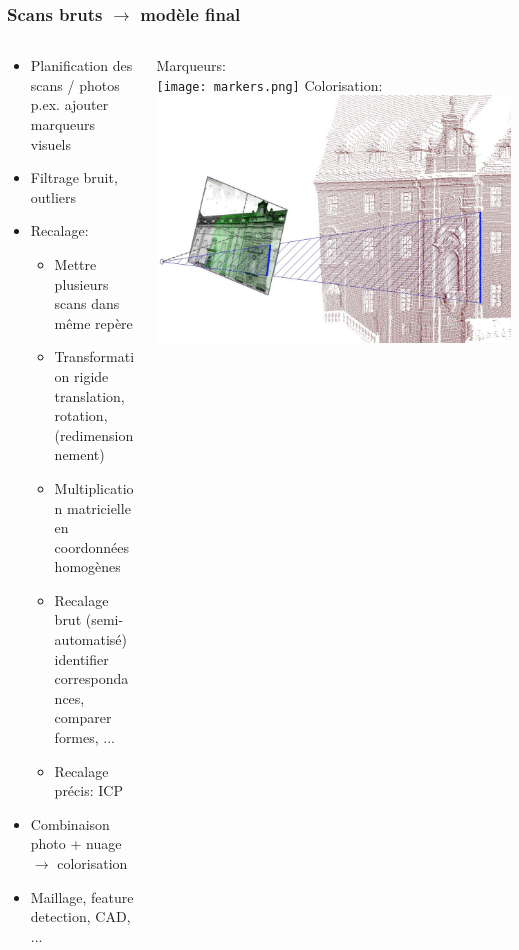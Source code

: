 \documentclass{beamer}
\begin{document}
\begin{frame}
\frametitle{Scans bruts $\rightarrow$ modèle final}
	\begin{columns}
	\begin{column}[T]{.7\textwidth}
		\begin{itemize}
		\item Planification des scans / photos
			\\ p.ex. ajouter marqueurs visuels
		\item Filtrage bruit, outliers
		\item Recalage:
			\begin{itemize}
				\item Mettre plusieurs scans dans même repère
				\item Transformation rigide \\
					translation, rotation, (redimensionnement)
				\item Multiplication matricielle en coordonnées homogènes
				\item Recalage brut (semi-automatisé)
					\\ identifier correspondances, comparer formes, ...
				\item Recalage précis: ICP
			\end{itemize}
		\item Combinaison photo + nuage $\rightarrow$ colorisation
		\item Maillage, feature detection, CAD, ...
		\end{itemize}
	\end{column}
	\begin{column}[T]{.3\textwidth}
		{\footnotesize Marqueurs: \cite{Lerm2009}} \\
		\texttt{[image: markers.png]}
		\vspace{1cm}
		{\footnotesize Colorisation: \cite{Lich2011} } \\
		\includegraphics[width=\textwidth]{imagetocloud.png}
	\end{column}
	\end{columns}
\end{frame}
\end{document}
